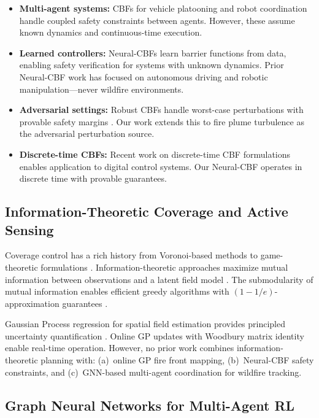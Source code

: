 \documentclass[12pt,a4paper]{article}
\begin{document}
\begin{itemize}[leftmargin=*]
    \item \textbf{Multi-agent systems:} CBFs for vehicle platooning \cite{Wang2018} and robot coordination \cite{Glotfelter2017} handle coupled safety constraints between agents. However, these assume known dynamics and continuous-time execution.
    \item \textbf{Learned controllers:} Neural-CBFs learn barrier functions from data, enabling safety verification for systems with unknown dynamics. Prior Neural-CBF work has focused on autonomous driving and robotic manipulation---never wildfire environments.
    \item \textbf{Adversarial settings:} Robust CBFs handle worst-case perturbations with provable safety margins \cite{Althoff2015}. Our work extends this to fire plume turbulence as the adversarial perturbation source.
    \item \textbf{Discrete-time CBFs:} Recent work on discrete-time CBF formulations \cite{Ames2019} enables application to digital control systems. Our Neural-CBF operates in discrete time with provable guarantees.
\end{itemize}

\subsection{Information-Theoretic Coverage and Active Sensing}

Coverage control has a rich history from Voronoi-based methods \cite{Cortes2004} to game-theoretic formulations \cite{Schwager2011}. Information-theoretic approaches maximize mutual information between observations and a latent field model \cite{Krause2008,Singh2009}. The submodularity of mutual information enables efficient greedy algorithms with $(1-1/e)$-approximation guarantees \cite{Nemhauser1978}.

Gaussian Process regression for spatial field estimation provides principled uncertainty quantification \cite{Rasmussen2006}. Online GP updates with Woodbury matrix identity enable real-time operation. However, no prior work combines information-theoretic planning with: (a)~online GP fire front mapping, (b)~Neural-CBF safety constraints, and (c)~GNN-based multi-agent coordination for wildfire tracking.

\subsection{Graph Neural Networks for Multi-Agent RL}
\end{document}
